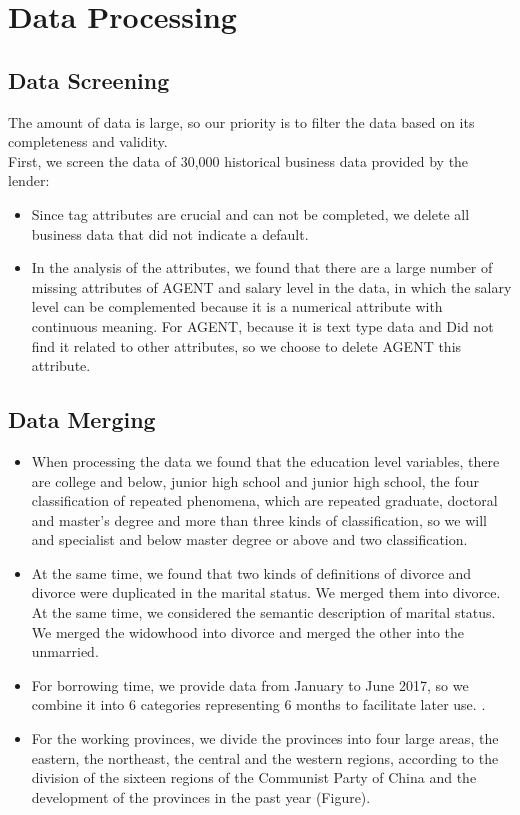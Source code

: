 \documentclass{mcmthesis}
\begin{document}
\section{Data Processing}
\subsection{Data Screening}
The amount of data is large, so our priority is to filter the data based on its completeness and validity.\\

First, we screen the data of 30,000 historical business data provided by the lender:\\
\begin{itemize}
\item Since tag attributes are crucial and can not be completed, we delete all business data that did not indicate a default.
\item In the analysis of the attributes, we found that there are a large number of missing attributes of AGENT and salary level in the data, in which the salary level can be complemented because it is a numerical attribute with continuous meaning. For AGENT, because it is text type data and Did not find it related to other attributes, so we choose to delete AGENT this attribute.
\end{itemize}

\subsection{Data Merging}
\begin{itemize}
\item When processing the data we found that the education level variables, there are college and below, junior high school and junior high school, the four classification of repeated phenomena, which are repeated graduate, doctoral and master's degree and more than three kinds of classification, so we will and specialist and below master degree or above and two classification.
\item At the same time, we found that two kinds of definitions of divorce and divorce were duplicated in the marital status. We merged them into divorce. At the same time, we considered the semantic description of marital status. We merged the widowhood into divorce and merged the other into the unmarried.
\item For borrowing time, we provide data from January to June 2017, so we combine it into 6 categories representing 6 months to facilitate later use. .
\item For the working provinces, we divide the provinces into four large areas, the eastern, the northeast, the central and the western regions, according to the division of the sixteen regions of the Communist Party of China and the development of the provinces in the past year (Figure).
\end{itemize}
\end{document}
